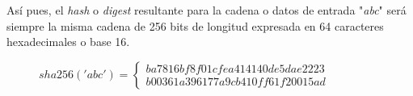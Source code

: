 \documentclass{article}
\begin{document}
    Así pues, el \textit{hash} o \textit{digest} resultante para la cadena o datos de entrada "\textit{abc}" será siempre la misma cadena de 256 bits de longitud expresada en 64 caracteres hexadecimales o base 16.
        \begin{figure}[H]
        \centering
            $sha256('abc') = \left \{
                \begin{array}{c}
                    ba7816bf8f01cfea414140de5dae2223 \\
                    b00361a396177a9cb410ff61f20015ad
                \end{array}
                \right .$
        \end{figure}
\end{document}
